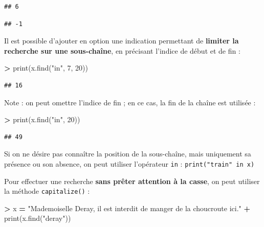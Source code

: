 \documentclass[12pt,]{book}
\newenvironment{Shaded}{\begin{snugshade}}{\end{snugshade}}
\newcommand{\DecValTok}[1]{\textcolor[rgb]{0.00,0.00,0.81}{#1}}
\newcommand{\StringTok}[1]{\textcolor[rgb]{0.31,0.60,0.02}{#1}}
\newcommand{\OperatorTok}[1]{\textcolor[rgb]{0.81,0.36,0.00}{\textbf{#1}}}
\newcommand{\BuiltInTok}[1]{#1}
\newcommand{\NormalTok}[1]{#1}
\numberwithin{equation}{section}
\numberwithin{countremarque}{section}
\let\BeginKnitrBlock\begin \let\EndKnitrBlock\end
\begin{document}
\begin{lstlisting}
## 6
\end{lstlisting}

\begin{lstlisting}
## -1
\end{lstlisting}

Il est possible d'ajouter en option une indication permettant de
\textbf{limiter la recherche sur une sous-chaîne}, en précisant l'indice
de début et de fin :

\begin{Shaded}
\begin{Highlighting}[]
\OperatorTok{>} \BuiltInTok{print}\NormalTok{(x.find(}\StringTok{"in"}\NormalTok{, }\DecValTok{7}\NormalTok{, }\DecValTok{20}\NormalTok{))}
\end{Highlighting}
\end{Shaded}

\begin{lstlisting}
## 16
\end{lstlisting}

Note : on peut omettre l'indice de fin ; en ce cas, la fin de la chaîne
est utilisée :

\begin{Shaded}
\begin{Highlighting}[]
\OperatorTok{>} \BuiltInTok{print}\NormalTok{(x.find(}\StringTok{"in"}\NormalTok{, }\DecValTok{20}\NormalTok{))}
\end{Highlighting}
\end{Shaded}

\begin{lstlisting}
## 49
\end{lstlisting}

\BeginKnitrBlock{remarque}
Si on ne désire pas connaître la position de la sous-chaîne, mais
uniquement sa présence ou son absence, on peut utiliser l'opérateur
\texttt{in} : \texttt{print("train"\ in\ x)}
\EndKnitrBlock{remarque}

Pour effectuer une recherche \textbf{sans prêter attention à la casse},
on peut utiliser la méthode \texttt{capitalize()} :

\begin{Shaded}
\begin{Highlighting}[]
\OperatorTok{>}\NormalTok{ x }\OperatorTok{=} \StringTok{"Mademoiselle Deray, il est interdit de manger de la choucroute ici."}
\OperatorTok{+} \BuiltInTok{print}\NormalTok{(x.find(}\StringTok{"deray"}\NormalTok{))}
\end{Highlighting}
\end{Shaded}
\end{document}
